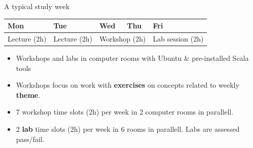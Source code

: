 \documentclass[aspectratio=169]{beamer}
\newenvironment{Slide}[1]%
  {\begin{frame}[environment=Slide]{#1}}
  {\end{frame}}%
\begin{document}
\begin{Slide}{A typical study week}
\begin{table}\centering
  \begin{tabular}{l | l |l l | l}
  Mon & Tue & Wed & Thu & Fri \\ \hline
  Lecture (2h) & Lecture (2h) & \multicolumn{2}{c|}{Workshop (2h)} & Lab session (2h) \\ \hline
  \end{tabular}
\end{table}
  \begin{itemize}
    \item Workshops and labs in computer rooms with Ubuntu \& pre-installed Scala tools 
    \item Workshops focus on work with \textbf{exercises} on concepts related to weekly \textbf{theme}. 
    \item 7 workshop time slots (2h) per week in 2 computer rooms in parallell. 
    \item 2 \textbf{lab} time slots (2h) per week in 6 rooms in parallell. Labs are assessed pass/fail.
  \end{itemize}
\end{Slide}  
\end{document}
